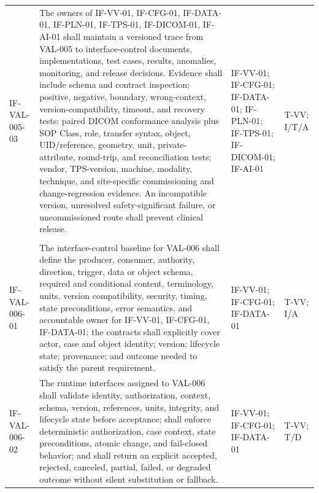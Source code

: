 \documentclass[11pt,letterpaper]{article}
\begin{document}
\begin{scriptsize}
\begin{longtable}{@{}L{0.14\textwidth}L{0.49\textwidth}L{0.19\textwidth}L{0.10\textwidth}@{}}
\mbox{IF-VAL-005-03} & The owners of IF-VV-01, IF-CFG-01, IF-DATA-01, IF-PLN-01, IF-TPS-01, IF-DICOM-01, IF-AI-01 shall maintain a versioned trace from VAL-005 to interface-control documents, implementations, test cases, results, anomalies, monitoring, and release decisions. Evidence shall include schema and contract inspection; positive, negative, boundary, wrong-context, version-compatibility, timeout, and recovery tests; paired DICOM conformance analysis plus SOP Class, role, transfer syntax, object, UID\slash\allowbreak{}reference, geometry, unit, private-attribute, round-trip, and reconciliation tests; vendor, TPS-version, machine, modality, technique, and site-specific commissioning and change-regression evidence. An incompatible version, unresolved safety-significant failure, or uncommissioned route shall prevent clinical release. & IF-VV-01; IF-CFG-01; IF-DATA-01; IF-PLN-01; IF-TPS-01; IF-DICOM-01; IF-AI-01 & T-VV; I\slash\allowbreak{}T\slash\allowbreak{}A \\
\addlinespace[2pt]
 \\
\addlinespace[2pt]
\mbox{IF-VAL-006-01} & The interface-control baseline for VAL-006 shall define the producer, consumer, authority, direction, trigger, data or object schema, required and conditional content, terminology, units, version compatibility, security, timing, state preconditions, error semantics, and accountable owner for IF-VV-01, IF-CFG-01, IF-DATA-01; the contracts shall explicitly cover actor, case and object identity; version; lifecycle state; provenance; and outcome needed to satisfy the parent requirement. & IF-VV-01; IF-CFG-01; IF-DATA-01 & T-VV; I\slash\allowbreak{}A \\
\addlinespace[2pt]
\mbox{IF-VAL-006-02} & The runtime interfaces assigned to VAL-006 shall validate identity, authorization, context, schema, version, references, units, integrity, and lifecycle state before acceptance; shall enforce deterministic authorization, case context, state preconditions, atomic change, and fail-closed behavior; and shall return an explicit accepted, rejected, canceled, partial, failed, or degraded outcome without silent substitution or fallback. & IF-VV-01; IF-CFG-01; IF-DATA-01 & T-VV; T\slash\allowbreak{}D \\

\end{longtable}
\end{scriptsize}
\end{document}
